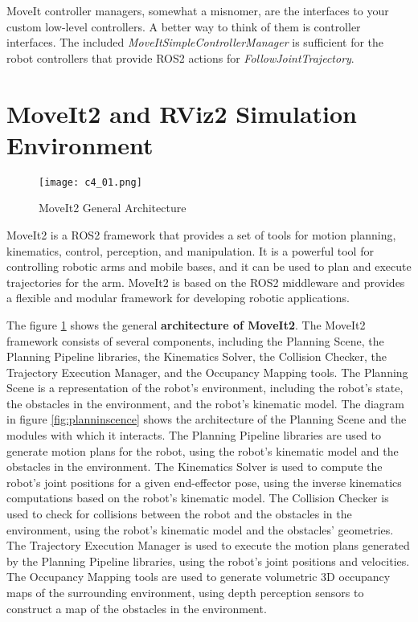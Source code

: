 MoveIt controller managers, somewhat a misnomer, are the interfaces to your custom low-level controllers. 
A better way to think of them is controller interfaces. The included \textit{MoveItSimpleControllerManager} is sufficient
for the robot controllers that provide ROS2 actions for \textit{FollowJointTrajectory}.

\section{MoveIt2 and RViz2 Simulation Environment}

\begin{figure}[t]
    \centering
    \texttt{[image: c4\_01.png]}
    \caption{MoveIt2 General Architecture}
    \label{fig:moveit2}
\end{figure}

MoveIt2 is a ROS2 framework that provides a set of tools for motion planning, kinematics, control, perception, and
manipulation. It is a powerful tool for controlling robotic arms and mobile bases, and it can be used to plan and
execute trajectories for the arm. MoveIt2 is based on the ROS2 middleware and provides a flexible and modular
framework for developing robotic applications.

The figure \ref{fig:moveit2} shows the general \textbf{architecture of MoveIt2}. The MoveIt2 framework consists of several
components, including the Planning Scene, the Planning Pipeline libraries, the Kinematics Solver, the Collision
Checker, the Trajectory Execution Manager, and the Occupancy Mapping tools.
The Planning Scene is a representation of the robot's environment, including the robot's state, the obstacles in the
environment, and the robot's kinematic model. The diagram in figure \ref{fig:planninscence} shows the architecture
of the Planning Scene and the modules with which it interacts.
The Planning Pipeline libraries are used to generate motion plans
for the robot, using the robot's kinematic model and the obstacles in the environment. The Kinematics Solver is
used to compute the robot's joint positions for a given end-effector pose, using the inverse kinematics
computations based on the robot's kinematic model. The Collision Checker is used to check for collisions between
the robot and the obstacles in the environment, using the robot's kinematic model and the obstacles' geometries.
The Trajectory Execution Manager is used to execute the motion plans generated by the Planning Pipeline libraries,
using the robot's joint positions and velocities. The Occupancy Mapping tools are used to generate volumetric 3D 
occupancy maps of the surrounding environment, using depth perception sensors to construct a map
of the obstacles in the environment. 

